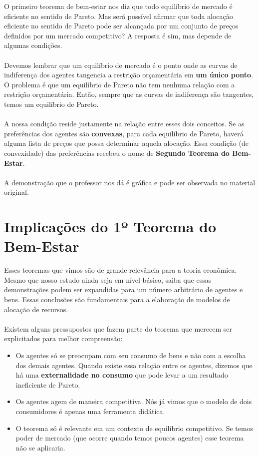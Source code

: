 \documentclass[a4paper,11pt,oneside]{book}
\theoremstyle{definition}
\theoremstyle{break}
\begin{document}
O primeiro teorema de bem-estar nos diz que todo equilíbrio de mercado é eficiente no sentido de Pareto. Mas será possível afirmar que toda alocação eficiente no sentido de Pareto pode ser alcançada por um conjunto de preços definidos por um mercado competitivo? A resposta é sim, mas depende de algumas condições.
\\
\\
Devemos lembrar que um equilíbrio de mercado é o ponto onde as curvas de indiferença dos agentes tangencia a restrição orçamentária em \textbf{um único ponto}. O problema é que um equilíbrio de Pareto não tem nenhuma relação com a restrição orçamentária. Então, sempre que as curvas de indiferença são tangentes, temos um equilíbrio de Pareto.
\\
\\
A nossa condição reside justamente na relação entre esses dois conceitos. Se as preferências dos agentes são \textbf{convexas}, para cada equilíbrio de Pareto, haverá alguma lista de preços que possa determinar aquela alocação. Essa condição (de convexidade) das preferências recebeu o nome de \textbf{Segundo Teorema do Bem-Estar}.
\\
\\
A demonstração que o professor nos dá é gráfica e pode ser observada no material original.

\section{Implicações do 1º Teorema do Bem-Estar}

Esses teoremas que vimos são de grande relevância para a teoria econômica. Mesmo que nosso estudo ainda seja em nível básico, saiba que essas demonstrações podem ser expandidas para um número arbitrário de agentes e bens. Essas conclusões são fundamentais para a elaboração de modelos de alocação de recursos.
\\
\\
Existem alguns pressupostos que fazem parte do teorema que merecem ser explicitados para melhor compreensão:

\begin{itemize}
\item Os agentes só se preocupam com seu consumo de bens e não com a escolha dos demais agentes. Quando existe essa relação entre os agentes, dizemos que há uma \textbf{externalidade no consumo} que pode levar a um resultado ineficiente de Pareto.

\item Os agentes agem de maneira competitiva. Nós já vimos que o modelo de dois consumidores é apenas uma ferramenta didática.

\item O teorema só é relevante em um contexto de equilíbrio competitivo. Se temos poder de mercado (que ocorre quando temos poucos agentes) esse teorema não se aplicaria.
\end{itemize}
\end{document}
